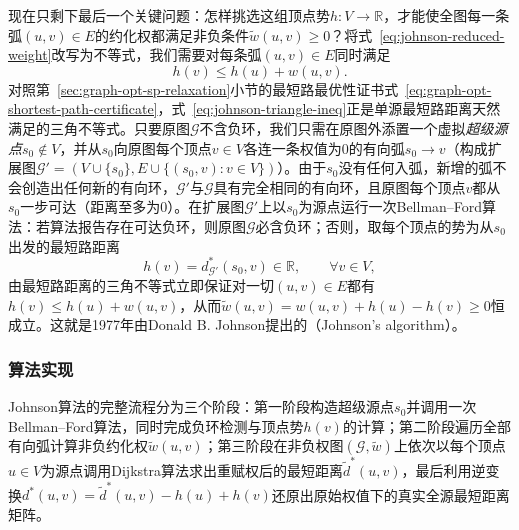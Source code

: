 现在只剩下最后一个关键问题：怎样挑选这组顶点势$h:V\to\mathbb R$，才能使全图每一条弧$(u,v)\in E$的约化权都满足非负条件$\tilde w(u,v)\geq0$？将式~\eqref{eq:johnson-reduced-weight}改写为不等式，我们需要对每条弧$(u,v)\in E$同时满足
\begin{equation}
  h(v) \leq h(u) + w(u,v).
  \label{eq:johnson-triangle-ineq}
\end{equation}
对照第~\ref{sec:graph-opt-sp-relaxation}小节的最短路最优性证书式~\eqref{eq:graph-opt-shortest-path-certificate}，式~\eqref{eq:johnson-triangle-ineq}正是单源最短路距离天然满足的三角不等式。只要原图$\mathcal G$不含负环，我们只需在原图外添置一个虚拟\emph{超级源点}$s_0\notin V$，并从$s_0$向原图每个顶点$v\in V$各连一条权值为$0$的有向弧$s_0\to v$（构成扩展图$\mathcal G'=(V\cup\{s_0\},E\cup\{(s_0,v):v\in V\})$）。由于$s_0$没有任何入弧，新增的弧不会创造出任何新的有向环，$\mathcal G'$与$\mathcal G$具有完全相同的有向环，且原图每个顶点$v$都从$s_0$一步可达（距离至多为$0$）。在扩展图$\mathcal G'$上以$s_0$为源点运行一次Bellman--Ford算法：若算法报告存在可达负环，则原图$\mathcal G$必含负环；否则，取每个顶点的势为从$s_0$出发的最短路距离
\begin{equation}
  h(v) = d^*_{\mathcal G'}(s_0,v)\in\mathbb R,\qquad\forall v\in V,
  \label{eq:johnson-potential-choice}
\end{equation}
由最短路距离的三角不等式立即保证对一切$(u,v)\in E$都有$h(v)\leq h(u)+w(u,v)$，从而$\tilde w(u,v)=w(u,v)+h(u)-h(v)\geq0$恒成立。这就是1977年由Donald B. Johnson提出的（Johnson's algorithm）。

\subsubsection{算法实现}

Johnson算法的完整流程分为三个阶段：第一阶段构造超级源点$s_0$并调用一次Bellman--Ford算法，同时完成负环检测与顶点势$h(v)$的计算；第二阶段遍历全部有向弧计算非负约化权$\tilde w(u,v)$；第三阶段在非负权图$(\mathcal G,\tilde w)$上依次以每个顶点$u\in V$为源点调用Dijkstra算法求出重赋权后的最短距离$\tilde d^*(u,v)$，最后利用逆变换$d^*(u,v)=\tilde d^*(u,v)-h(u)+h(v)$还原出原始权值下的真实全源最短距离矩阵。

